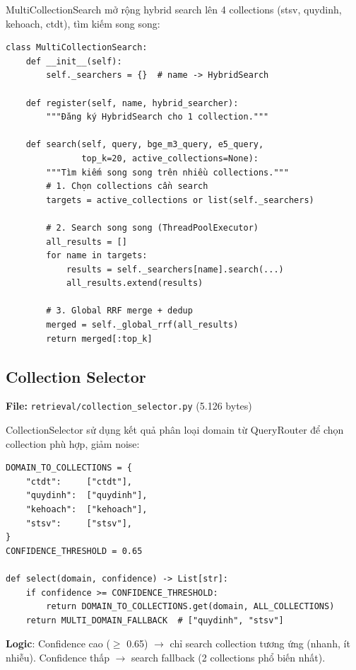 \documentclass[../DoAn.tex]{subfiles}
\begin{document}
MultiCollectionSearch mở rộng hybrid search lên 4 collections (stsv, quydinh, kehoach, ctdt), tìm kiếm song song:
\begin{verbatim}
class MultiCollectionSearch:
    def __init__(self):
        self._searchers = {}  # name -> HybridSearch

    def register(self, name, hybrid_searcher):
        """Đăng ký HybridSearch cho 1 collection."""

    def search(self, query, bge_m3_query, e5_query,
               top_k=20, active_collections=None):
        """Tìm kiếm song song trên nhiều collections."""
        # 1. Chọn collections cần search
        targets = active_collections or list(self._searchers)

        # 2. Search song song (ThreadPoolExecutor)
        all_results = []
        for name in targets:
            results = self._searchers[name].search(...)
            all_results.extend(results)

        # 3. Global RRF merge + dedup
        merged = self._global_rrf(all_results)
        return merged[:top_k]
\end{verbatim}

\subsection{Collection Selector}
\textbf{File:} \texttt{retrieval/collection\_selector.py} (5.126 bytes)

CollectionSelector sử dụng kết quả phân loại domain từ QueryRouter để chọn collection phù hợp, giảm noise:
\begin{verbatim}
DOMAIN_TO_COLLECTIONS = {
    "ctdt":     ["ctdt"],
    "quydinh":  ["quydinh"],
    "kehoach":  ["kehoach"],
    "stsv":     ["stsv"],
}
CONFIDENCE_THRESHOLD = 0.65

def select(domain, confidence) -> List[str]:
    if confidence >= CONFIDENCE_THRESHOLD:
        return DOMAIN_TO_COLLECTIONS.get(domain, ALL_COLLECTIONS)
    return MULTI_DOMAIN_FALLBACK  # ["quydinh", "stsv"]
\end{verbatim}

\textbf{Logic}: Confidence cao ($\geq$ 0.65) $\rightarrow$ chỉ search collection tương ứng (nhanh, ít nhiễu). Confidence thấp $\rightarrow$ search fallback (2 collections phổ biến nhất).

\end{document}

